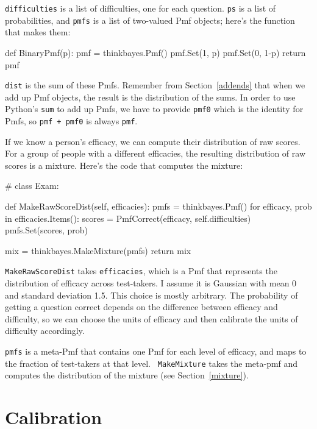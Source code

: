 \documentclass[12pt]{book}
\theoremstyle{exercise}
\newcommand{\py}[1]{{\tt #1}}%
\begin{document}
\py{difficulties} is a list of difficulties, one for each question.
\py{ps} is a list of probabilities, and \py{pmfs} is a list of
two-valued Pmf objects; here's the function that makes them:

\begin{code}
def BinaryPmf(p):
    pmf = thinkbayes.Pmf()
    pmf.Set(1, p)
    pmf.Set(0, 1-p)
    return pmf
\end{code}

\py{dist} is the sum of these Pmfs.  Remember from Section~\ref{addends}
that when we add up Pmf objects, the result is the distribution
of the sums.  In order to use Python's \py{sum} to add up Pmfs,
we have to provide \py{pmf0} which is the identity for Pmfs,
so \py{pmf + pmf0} is always \py{pmf}.

If we know a person's efficacy, we can compute their distribution
of raw scores.  For a group of people with a different efficacies, the
resulting distribution of raw scores is a mixture.  Here's the code
that computes the mixture:

\begin{code}
# class Exam:

    def MakeRawScoreDist(self, efficacies):
        pmfs = thinkbayes.Pmf()
        for efficacy, prob in efficacies.Items():
            scores = PmfCorrect(efficacy, self.difficulties)
            pmfs.Set(scores, prob)

        mix = thinkbayes.MakeMixture(pmfs)
        return mix
\end{code}

\py{MakeRawScoreDist} takes \py{efficacies}, which is a Pmf that
represents the distribution of efficacy across test-takers.  I assume
it is Gaussian with mean 0 and standard deviation 1.5.  This
choice is mostly arbitrary.  The probability of getting a question
correct depends on the difference between efficacy and difficulty, so
we can choose the units of efficacy and then calibrate the units of
difficulty accordingly.  

\py{pmfs} is a meta-Pmf that contains one Pmf for each level of
efficacy, and maps to the fraction of test-takers at that level.  {\tt
  MakeMixture} takes the meta-pmf and computes the distribution of the
mixture (see Section~\ref{mixture}).  


\section{Calibration}
\end{document}
